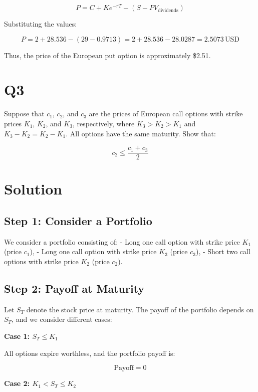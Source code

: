 \documentclass[12pt,letterpaper, onecolumn]{exam}
\begin{document}
\[
P = C + K e^{-rT} - (S - PV_{\text{dividends}})
\]

Substituting the values:

\[
P = 2 + 28.536 - (29 - 0.9713) = 2 + 28.536 - 28.0287 = 2.5073 \, \text{USD}
\]

Thus, the price of the European put option is approximately \$2.51.

\newpage

    \pagebreak %
    
\section*{Q3}

Suppose that \( c_1 \), \( c_2 \), and \( c_3 \) are the prices of European call options with strike prices \( K_1 \), \( K_2 \), and \( K_3 \), respectively, where \( K_3 > K_2 > K_1 \) and \( K_3 - K_2 = K_2 - K_1 \). All options have the same maturity. Show that:

\[
c_2 \leq \frac{c_1 + c_3}{2}
\]

\section*{Solution}

\subsection*{Step 1: Consider a Portfolio}

We consider a portfolio consisting of:
- Long one call option with strike price \( K_1 \) (price \( c_1 \)),
- Long one call option with strike price \( K_3 \) (price \( c_3 \)),
- Short two call options with strike price \( K_2 \) (price \( c_2 \)).

\subsection*{Step 2: Payoff at Maturity}

Let \( S_T \) denote the stock price at maturity. The payoff of the portfolio depends on \( S_T \), and we consider different cases:

\textbf{Case 1: \( S_T \leq K_1 \)}

All options expire worthless, and the portfolio payoff is:

\[
\text{Payoff} = 0
\]

\textbf{Case 2: \( K_1 < S_T \leq K_2 \)}
\end{document}
